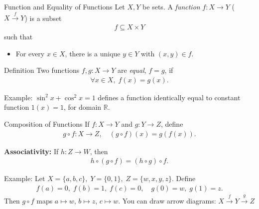 \begin{frame}{Function and Equality of Functions}
Let \(X, Y\) be sets. A \emph{function} \(f: X \to Y\) ($X \xrightarrow{f} Y$) is a subset
\begin{align*}
f \subseteq X \times Y
\end{align*}
such that
\begin{itemize}
  \item For every \(x \in X\), there is a unique \(y \in Y\) with \((x,y) \in f\).
\end{itemize}

\medskip
\begin{block}{Definition}
Two functions \(f, g: X \to Y\) are \emph{equal}, \(f = g\), if
\begin{align*}
\forall x \in X,\; f(x) = g(x).
\end{align*}
\end{block}
\vspace{-0.5cm}

\begin{block}{Example:} \(\sin^2 x + \cos^2 x = 1\) defines a function identically equal to constant function \(1(x)=1\), for domain \(\mathbb{R}\).
\end{block}
\end{frame}



\begin{frame}{Composition of Functions}
If \(f: X \to Y\) and \(g: Y \to Z\), define
\begin{align*}
g \circ f: X \to Z, \quad (g \circ f)(x) = g(f(x)).
\end{align*}

\medskip

\textbf{Associativity:} If \(h: Z \to W\), then
\begin{align*}
h \circ (g \circ f) = (h \circ g) \circ f.
\end{align*}
\vspace{-0.5cm}
\begin{block}{Example:}
Let  $X = \{a,b,c\},\; Y = \{0,1\},\; Z = \{w,x,y,z\}.$ Define 
\begin{align*}
f(a)=0,\; f(b)=1,\; f(c)=0, \quad
g(0)=w,\; g(1)=z.
\end{align*}
Then \(g \circ f\) maps \(a\mapsto w\), \(b\mapsto z\), \(c\mapsto w\).  
You can draw arrow diagrams:
$X \xrightarrow{f} Y \xrightarrow{g} Z$
\end{block}
\end{frame}


